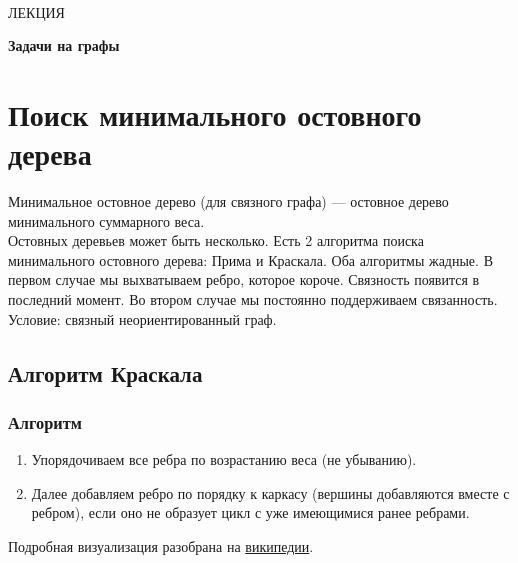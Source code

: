 \documentclass[a4paper,12pt]{article}
\theoremstyle{plain} %
\theoremstyle{definition} %
\theoremstyle{remark} %
\newcounter{num}
\begin{document}
\newcommand{\lec}[1]{\addtocounter{lec}{1} \setcounter{section}{0}%
\begin{center}
{\LARGE ЛЕКЦИЯ %
\vspace{2mm}%

\textbf{#1}%
}
\end{center}
}
\newpage
\
\setcounter{lec}{19}
\lec{Задачи на графы}
\section{Поиск минимального остовного дерева}
Минимальное остовное дерево (для связного графа) --- остовное дерево минимального суммарного веса. \\
Остовных деревьев может быть несколько. Есть 2 алгоритма поиска минимального остовного дерева: Прима и Краскала. 
Оба алгоритмы жадные. В первом случае мы выхватываем ребро, которое короче. Связность появится в последний момент. Во втором случае мы постоянно поддерживаем связанность.
Условие: связный неориентированный граф.
\subsection{Алгоритм Краскала}
\subsubsection{Алгоритм}
\begin{enumerate}
\item Упорядочиваем все ребра по возрастанию веса (не убыванию).
\item Далее добавляем ребро по порядку к каркасу (вершины добавляются вместе с ребром), если оно не образует цикл с уже имеющимися  ранее ребрами.
\end{enumerate}
Подробная визуализация разобрана на \href{https://ru.wikipedia.org/wiki/%D0%90%D0%BB%D0%B3%D0%BE%D1%80%D0%B8%D1%82%D0%BC_%D0%9A%D1%80%D0%B0%D1%81%D0%BA%D0%B0%D0%BB%D0%B0}{википедии}.
\end{document}
